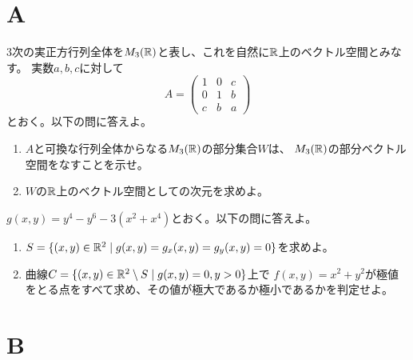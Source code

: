 \documentclass[report]{jlreq}
\begin{document}
%
\section{A}

\begin{problem}[第1問]
    $3$次の実正方行列全体を$M_3(\mathbb{R})$と表し、これを自然に$\mathbb{R}$上のベクトル空間とみなす。
    実数$a, b, c$に対して
    \[
        A = \begin{pmatrix}
            1 & 0 & c \\
            0 & 1 & b \\
            c & b & a
        \end{pmatrix}
    \]
    とおく。以下の問に答えよ。
    \begin{enumerate}
        \item $A$と可換な行列全体からなる$M_3(\mathbb{R})$の部分集合$W$は、
            $M_3(\mathbb{R})$の部分ベクトル空間をなすことを示せ。
        \item $W$の$\mathbb{R}$上のベクトル空間としての次元を求めよ。
    \end{enumerate}
\end{problem}

\begin{answer}
    \TODO{}
\end{answer}

\begin{problem}[第2問]
    $g(x, y) = y^4 - y^6 - 3(x^2 + x^4)$とおく。以下の問に答えよ。
    \begin{enumerate}
        \item $S = \{(x, y) \in \mathbb{R}^2 \mid g(x, y) = g_x(x, y) = g_y(x, y) = 0\}$を求めよ。
        \item 曲線$C = \{(x, y) \in \mathbb{R}^2 \setminus S \mid g(x, y) = 0, y > 0\}$上で
            $f(x, y) = x^2 + y^2$が極値をとる点をすべて求め、その値が極大であるか極小であるかを判定せよ。
    \end{enumerate}
\end{problem}

\begin{answer}
\end{answer}

%
\section{B}
\end{document}
